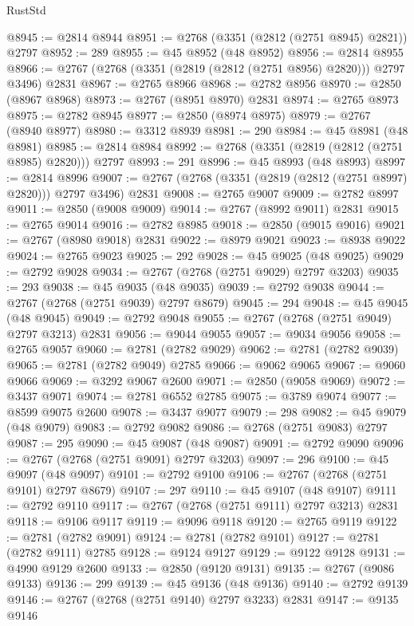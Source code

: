 \begin{lexlean}{RustStd}
\begin{coremodule}
@8945 := @2814 @8944
@8951 := @2768 (@3351 (@2812 (@2751 @8945) @2821)) @2797
@8952 := 289
@8955 := @45 @8952 (@48 @8952)
@8956 := @2814 @8955
@8966 := @2767 (@2768 (@3351 (@2819 (@2812 (@2751 @8956) @2820))) @2797 @3496) @2831
@8967 := @2765 @8966
@8968 := @2782 @8956
@8970 := @2850 (@8967 @8968)
@8973 := @2767 (@8951 @8970) @2831
@8974 := @2765 @8973
@8975 := @2782 @8945
@8977 := @2850 (@8974 @8975)
@8979 := @2767 (@8940 @8977)
@8980 := @3312 @8939
@8981 := 290
@8984 := @45 @8981 (@48 @8981)
@8985 := @2814 @8984
@8992 := @2768 (@3351 (@2819 (@2812 (@2751 @8985) @2820))) @2797
@8993 := 291
@8996 := @45 @8993 (@48 @8993)
@8997 := @2814 @8996
@9007 := @2767 (@2768 (@3351 (@2819 (@2812 (@2751 @8997) @2820))) @2797 @3496) @2831
@9008 := @2765 @9007
@9009 := @2782 @8997
@9011 := @2850 (@9008 @9009)
@9014 := @2767 (@8992 @9011) @2831
@9015 := @2765 @9014
@9016 := @2782 @8985
@9018 := @2850 (@9015 @9016)
@9021 := @2767 (@8980 @9018) @2831
@9022 := @8979 @9021
@9023 := @8938 @9022
@9024 := @2765 @9023
@9025 := 292
@9028 := @45 @9025 (@48 @9025)
@9029 := @2792 @9028
@9034 := @2767 (@2768 (@2751 @9029) @2797 @3203)
@9035 := 293
@9038 := @45 @9035 (@48 @9035)
@9039 := @2792 @9038
@9044 := @2767 (@2768 (@2751 @9039) @2797 @8679)
@9045 := 294
@9048 := @45 @9045 (@48 @9045)
@9049 := @2792 @9048
@9055 := @2767 (@2768 (@2751 @9049) @2797 @3213) @2831
@9056 := @9044 @9055
@9057 := @9034 @9056
@9058 := @2765 @9057
@9060 := @2781 (@2782 @9029)
@9062 := @2781 (@2782 @9039)
@9065 := @2781 (@2782 @9049) @2785
@9066 := @9062 @9065
@9067 := @9060 @9066
@9069 := @3292 @9067 @2600
@9071 := @2850 (@9058 @9069)
@9072 := @3437 @9071
@9074 := @2781 @6552 @2785
@9075 := @3789 @9074
@9077 := @8599 @9075 @2600
@9078 := @3437 @9077
@9079 := 298
@9082 := @45 @9079 (@48 @9079)
@9083 := @2792 @9082
@9086 := @2768 (@2751 @9083) @2797
@9087 := 295
@9090 := @45 @9087 (@48 @9087)
@9091 := @2792 @9090
@9096 := @2767 (@2768 (@2751 @9091) @2797 @3203)
@9097 := 296
@9100 := @45 @9097 (@48 @9097)
@9101 := @2792 @9100
@9106 := @2767 (@2768 (@2751 @9101) @2797 @8679)
@9107 := 297
@9110 := @45 @9107 (@48 @9107)
@9111 := @2792 @9110
@9117 := @2767 (@2768 (@2751 @9111) @2797 @3213) @2831
@9118 := @9106 @9117
@9119 := @9096 @9118
@9120 := @2765 @9119
@9122 := @2781 (@2782 @9091)
@9124 := @2781 (@2782 @9101)
@9127 := @2781 (@2782 @9111) @2785
@9128 := @9124 @9127
@9129 := @9122 @9128
@9131 := @4990 @9129 @2600
@9133 := @2850 (@9120 @9131)
@9135 := @2767 (@9086 @9133)
@9136 := 299
@9139 := @45 @9136 (@48 @9136)
@9140 := @2792 @9139
@9146 := @2767 (@2768 (@2751 @9140) @2797 @3233) @2831
@9147 := @9135 @9146

\end{coremodule}
\end{lexlean}
